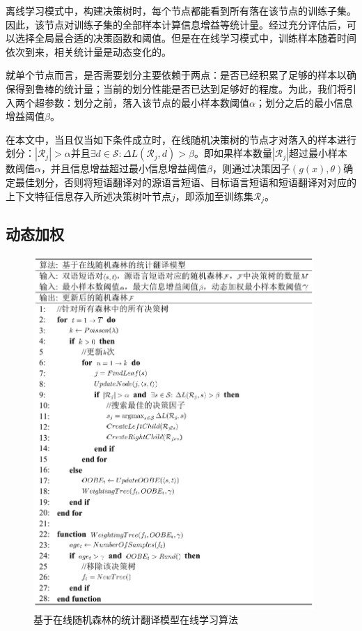 离线学习模式中，构建决策树时，每个节点都能看到所有落在该节点的训练子集。因此，该节点对训练子集的全部样本计算信息增益等统计量。经过充分评估后，可以选择全局最合适的决策函数和阈值。但是在在线学习模式中，训练样本随着时间依次到来，相关统计量是动态变化的。

就单个节点而言，是否需要划分主要依赖于两点：是否已经积累了足够的样本以确保得到鲁棒的统计量；当前的划分性能是否已达到足够好的程度。为此，我们将引入两个超参数：划分之前，落入该节点的最小样本数阈值$\alpha$；划分之后的最小信息增益阈值$\beta$。

在本文中，当且仅当如下条件成立时，在线随机决策树的节点才对落入的样本进行划分：$|\mathcal{R}_j| > \alpha$并且$\exists d \in \mathcal{S}: \Delta L(\mathcal{R}_j,d) > \beta$。即如果样本数量$|\mathcal{R}_j|$超过最小样本数阈值$\alpha$，并且信息增益超过最小信息增益阈值$\beta$，则通过决策因子$(g(x),\theta)$确定最佳划分，否则将短语翻译对的源语言短语、目标语言短语和短语翻译对对应的上下文特征信息存入所述决策树叶节点$j$，即添加至训练集$\mathcal{R}_j$。

\subsection{动态加权}

\begin{figure}[!tb]
	\centering
	\includegraphics[width=0.95\textwidth]{Figure/Figure_5_3.pdf}
	\caption{基于在线随机森林的统计翻译模型在线学习算法}
	\label{Fig_online_algorithm}
\end{figure}

